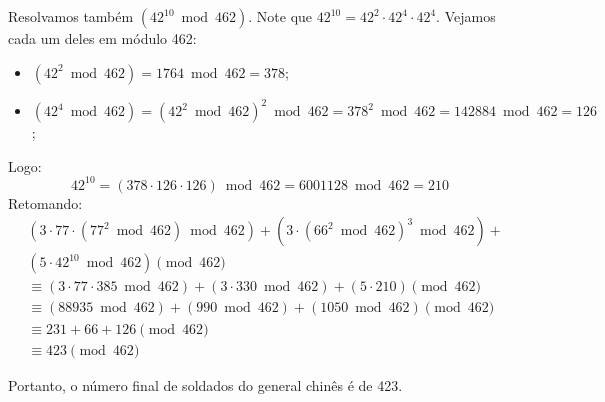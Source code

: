 Resolvamos também $(42^{10} \bmod{462})$. Note que $42^{10} = 42^2 \cdot 42^4 \cdot 42^4$. Vejamos cada um deles em módulo 462:
\begin{itemize}
	\item $(42^2 \bmod{462}) = 1764 \bmod{462} = 378$;
	\item $(42^4 \bmod{462}) = (42^2 \bmod{462})^2 \bmod{462} = 378^2 \bmod{462} = 142884 \bmod{462} = 126$;
\end{itemize}
Logo:
\begin{displaymath}
	42^{10} = (378 \cdot 126 \cdot 126) \bmod{462} = 6001128 \bmod{462} = 210
\end{displaymath}
Retomando:
\begin{align*}
	&(3 \cdot 77 \cdot (77^2 \bmod{462}) \bmod{462}) + (3 \cdot (66^2 \bmod{462})^3 \bmod{462}) + \\& (5 \cdot 42^{10} \bmod{462}) \pmod{462} \\ &\equiv (3 \cdot 77 \cdot 385 \bmod{462}) + (3 \cdot 330 \bmod{462}) + (5 \cdot 210) \pmod{462} \\ 
	&\equiv (88935 \bmod{462}) + (990 \bmod{462}) + (1050 \bmod{462}) \pmod{462} \\ 
	&\equiv 231 + 66 + 126 \pmod{462} \\
	&\equiv 423 \pmod{462}
\end{align*}

Portanto, o número final de soldados do general chinês é de 423.

